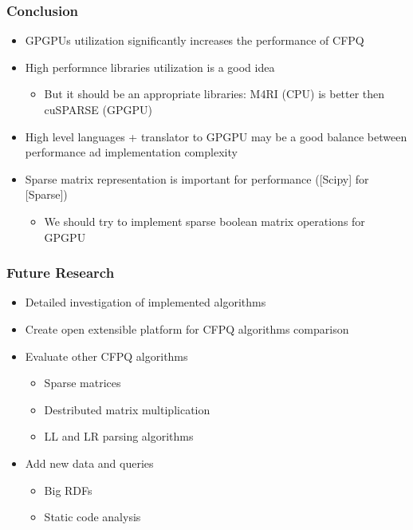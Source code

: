 \documentclass[xcolor=table]{beamer}
\begin{document}
\begin{frame}[fragile] \frametitle{Conclusion}
  \begin{itemize}
    \item GPGPUs utilization significantly increases the performance of CFPQ
    \pause
    \item High performnce libraries utilization is a good idea
    \begin{itemize}
      \item But it should be an appropriate libraries: M4RI (CPU) is better then cuSPARSE (GPGPU)
    \end{itemize}
    \pause
    \item High level languages + translator to GPGPU may be a good balance between performance ad implementation complexity
    \pause
    \item Sparse matrix representation is important for performance ([Scipy] for [Sparse])
    \begin{itemize}
      \item We should try to implement sparse boolean matrix operations for GPGPU
    \end{itemize}
  \end{itemize}
\end{frame}

\begin{frame}[fragile] \frametitle{Future Research}
  \begin{itemize}
    \item Detailed investigation of implemented algorithms
    \item Create open extensible platform for CFPQ algorithms comparison
    \item Evaluate other CFPQ algorithms
    \begin{itemize}
      \item Sparse matrices
      \item Destributed matrix multiplication
      \item LL and LR parsing algorithms
    \end{itemize}
    \item Add new data and queries
    \begin{itemize}
      \item Big RDFs
      \item Static code analysis
    \end{itemize}
  \end{itemize}
\end{frame}
\end{document}
